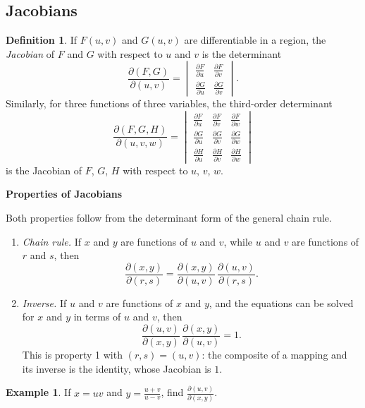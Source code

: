 \documentclass[11pt,a4paper]{article}
\theoremstyle{definition}
\newtheorem{defn}[thm]{Definition}
\newtheorem{exa}[thm]{Example}
\newcommand{\subhead}[1]{%
  \par\medskip\noindent\textbf{#1}\par\nobreak\smallskip}
\begin{document}
{\color[wave]{485}\subsection{Jacobians}}

\begin{defn}
\label{defn:jacobian}
If $F(u,v)$ and $G(u,v)$ are differentiable in a region, the \emph{Jacobian} of
$F$ and $G$ with respect to $u$ and $v$ is the determinant
\[ \frac{\partial (F,G)}{\partial(u,v)} =
\begin{vmatrix}
\frac{\partial F}{\partial u} & \frac{\partial F}{\partial v}\\[1ex]
\frac{\partial G}{\partial u} & \frac{\partial G}{\partial v}
\end{vmatrix}.
\]
Similarly, for three functions of three variables, the third-order determinant
\[  \frac{\partial (F,G, H)}{\partial(u,v,w)} =
\begin{vmatrix}
\frac{\partial F}{\partial u} & \frac{\partial F}{\partial v} &  \frac{\partial
F}{\partial w}\\[1ex]
\frac{\partial G}{\partial u} & \frac{\partial G}{\partial v} &  \frac{\partial
G}{\partial w}\\[1ex]
\frac{\partial H}{\partial u} & \frac{\partial H}{\partial v} &  \frac{\partial
H}{\partial w}
\end{vmatrix}
\]
is the Jacobian of $F$, $G$, $H$ with respect to $u$, $v$, $w$.
\end{defn}

\subhead{Properties of Jacobians}
Both properties follow from the determinant form of the general chain rule.
\begin{enumerate}
\item \emph{Chain rule.} If $x$ and $y$ are functions of $u$ and $v$, while $u$
and $v$ are functions of $r$ and $s$, then
\[\frac{\partial (x,y)}{\partial(r,s)} = \frac{\partial (x,y)}{\partial
(u,v)}\,\frac{\partial(u,v)}{\partial (r,s)} .\]

\item \emph{Inverse.} If $u$ and $v$ are functions of $x$ and $y$, and the
equations can be solved for $x$ and $y$ in terms of $u$ and $v$, then
\[\frac{\partial (u,v)}{\partial(x,y)}\,\frac{\partial (x,y)}{\partial(u,v)}=1 .\]
This is property 1 with $(r,s) = (u,v)$: the composite of a mapping and its
inverse is the identity, whose Jacobian is $1$.
\end{enumerate}

\begin{exa}
\label{ex:jacinverse}
If $x = uv$ and $y =\frac{u + v}{u -v}$, find $\frac{\partial (u,v)}{\partial(x,y)}$.
\end{exa}
\end{document}
